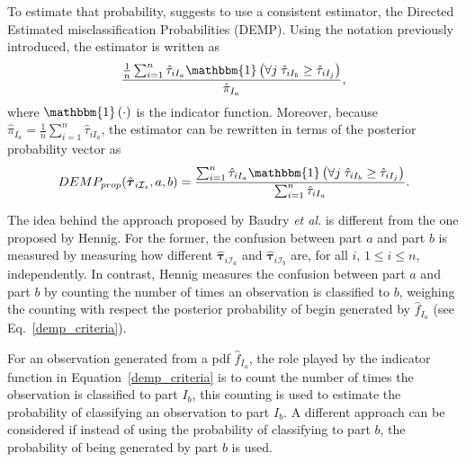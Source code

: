 \documentclass[10pt, a4paper]{article}
\newcommand{\m}[1]{\boldsymbol{#1}}
\begin{document}
To estimate that probability,  \cite{hennig2010methods} suggests to use a consistent estimator, the Directed Estimated misclassification Probabilities (DEMP). Using the notation previously introduced, the estimator is written as
\[
\frac{ \frac{1}{n} \sum_{i=1}^n {\hat{\tau}_{iI_a} \mathbbm{1}\left( \forall j\; \hat{\tau}_{i I_{b}} \geq \hat{\tau}_{iI_j} \right)}}{ \hat{\pi}_{I_a}},
\]
where $\mathbbm{1}\left( \cdot \right)$ is the indicator function. Moreover, because $ \hat{\pi}_{I_a} = \frac{1}{n} \sum_{i=1}^n \hat{\tau}_{iI_a}$, the estimator can be rewritten in terms of the posterior probability vector as
\begin{equation}\label{demp_criteria}
DEMP_{prop}(\hat{\m \tau}_{i \mathcal{I}_s}, a, b) =\frac{ \sum_{i=1}^n {\hat{\tau}_{iI_a} \mathbbm{1}\left( \forall j\; \hat{\tau}_{i I_{b}} \geq \hat{\tau}_{iI_j} \right)}}{\sum_{i=1}^n \hat{\tau}_{iI_a} }.
\end{equation}

The idea behind the approach proposed by Baudry \emph{et al.} is different from the one proposed by Hennig. For the former, the confusion between part $a$ and part $b$ is measured by measuring how different $\hat{\m \tau}_{i \mathcal{I}_a}$ and $\hat{\m \tau}_{i \mathcal{I}_b}$ are, for all $i$, $1\leq i \leq n$, independently. In contrast, Hennig measures the confusion between part $a$ and part $b$ by counting the number of times an observation is classified to $b$, weighing the counting with respect the posterior probability of begin generated by $\hat{f}_{I_a}$ (see Eq.~\ref{demp_criteria}).



For an observation generated from a pdf $\hat{f}_{I_a}$, the role played by the indicator function in Equation~\ref{demp_criteria} is to count the number of times the observation is classified to part $I_b$, this counting is used to estimate the probability of classifying an observation to part $I_b$. A different approach can be considered if instead of using the probability of classifying to part $b$, the probability of being generated by part $b$ is used.
\end{document}
